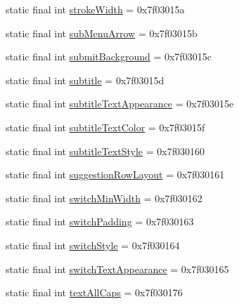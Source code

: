 \begin{DoxyCompactItemize}
static final int \mbox{\hyperlink{classcom_1_1synnapps_1_1carouselview_1_1_r_1_1attr_a2f0ef8d9ceeef113d537dcfbc99452ab}{stroke\+Width}} = 0x7f03015a
\item 
static final int \mbox{\hyperlink{classcom_1_1synnapps_1_1carouselview_1_1_r_1_1attr_ac0c1c7ac40b179270091d787760aaff3}{sub\+Menu\+Arrow}} = 0x7f03015b
\item 
static final int \mbox{\hyperlink{classcom_1_1synnapps_1_1carouselview_1_1_r_1_1attr_a749bd89968a16315a6a413418cfea2e7}{submit\+Background}} = 0x7f03015c
\item 
static final int \mbox{\hyperlink{classcom_1_1synnapps_1_1carouselview_1_1_r_1_1attr_aad9226a51a607d59aa471f1d32a6b9cf}{subtitle}} = 0x7f03015d
\item 
static final int \mbox{\hyperlink{classcom_1_1synnapps_1_1carouselview_1_1_r_1_1attr_adc28f9ad9c96d763a5051695f9a8225c}{subtitle\+Text\+Appearance}} = 0x7f03015e
\item 
static final int \mbox{\hyperlink{classcom_1_1synnapps_1_1carouselview_1_1_r_1_1attr_a1bbcb4b0d842a34a137598cd9fcba8f5}{subtitle\+Text\+Color}} = 0x7f03015f
\item 
static final int \mbox{\hyperlink{classcom_1_1synnapps_1_1carouselview_1_1_r_1_1attr_a881012d60081716d227a52a9c737898d}{subtitle\+Text\+Style}} = 0x7f030160
\item 
static final int \mbox{\hyperlink{classcom_1_1synnapps_1_1carouselview_1_1_r_1_1attr_ac3ab14be0c5806dda8c11fbf35d2f632}{suggestion\+Row\+Layout}} = 0x7f030161
\item 
static final int \mbox{\hyperlink{classcom_1_1synnapps_1_1carouselview_1_1_r_1_1attr_abdf029bd2da8b9970bb4c045c4df0d5d}{switch\+Min\+Width}} = 0x7f030162
\item 
static final int \mbox{\hyperlink{classcom_1_1synnapps_1_1carouselview_1_1_r_1_1attr_a65a5c2a10c519a247df9ac3b1d02c8b4}{switch\+Padding}} = 0x7f030163
\item 
static final int \mbox{\hyperlink{classcom_1_1synnapps_1_1carouselview_1_1_r_1_1attr_a9be8d2f67fd0f083977bd18eb0d10d19}{switch\+Style}} = 0x7f030164
\item 
static final int \mbox{\hyperlink{classcom_1_1synnapps_1_1carouselview_1_1_r_1_1attr_aeb83f3238177d57919333f3a21093df4}{switch\+Text\+Appearance}} = 0x7f030165
\item 
static final int \mbox{\hyperlink{classcom_1_1synnapps_1_1carouselview_1_1_r_1_1attr_a05debb17d3888ba526beb183e8e2c46b}{text\+All\+Caps}} = 0x7f030176
\item 

\end{DoxyCompactItemize}
